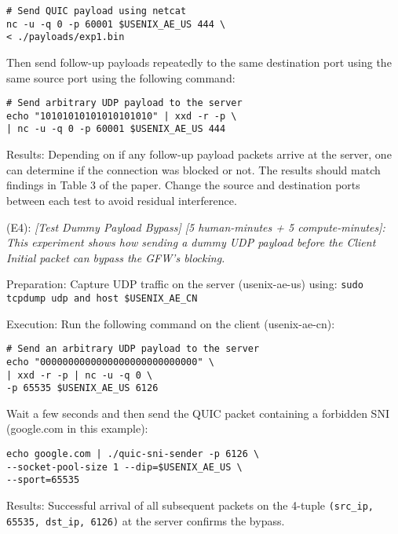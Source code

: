 \begin{compactdesc}
\begin{asparadesc}
\begin{verbatim}
# Send QUIC payload using netcat
nc -u -q 0 -p 60001 $USENIX_AE_US 444 \ 
< ./payloads/exp1.bin
\end{verbatim}
Then send follow-up payloads repeatedly to the same destination port using the same source port using the following command:
\begin{verbatim}
# Send arbitrary UDP payload to the server
echo "10101010101010101010" | xxd -r -p \
| nc -u -q 0 -p 60001 $USENIX_AE_US 444
\end{verbatim}

        \item[Results:] Depending on if any follow-up payload packets arrive at the server, one can determine if the connection was blocked or not. The results should match findings in Table 3 of the paper. Change the source and destination ports between each test to avoid residual interference.
    \end{asparadesc}





    \item[(E4):] \textit{[Test Dummy Payload Bypass] [5 human-minutes + 5 compute-minutes]: This experiment shows how sending a dummy UDP payload before the Client Initial packet can bypass the GFW's blocking.}
    \begin{asparadesc}
        \item[Preparation:] Capture UDP traffic on the server (usenix-ae-us) using: \texttt{sudo tcpdump udp and host \$USENIX\_AE\_CN }
        \item[Execution:] Run the following command on the client (usenix-ae-cn):
\begin{verbatim}
# Send an arbitrary UDP payload to the server
echo "0000000000000000000000000000" \
| xxd -r -p | nc -u -q 0 \
-p 65535 $USENIX_AE_US 6126
\end{verbatim}
Wait a few seconds and then send the QUIC packet containing a forbidden SNI (google.com in this example):
\begin{verbatim}
echo google.com | ./quic-sni-sender -p 6126 \
--socket-pool-size 1 --dip=$USENIX_AE_US \
--sport=65535
\end{verbatim}
        \item[Results:] Successful arrival of all subsequent packets on the 4-tuple \texttt{(src\_ip, 65535, dst\_ip, 6126)} at the server confirms the bypass. 
    \end{asparadesc}

\end{compactdesc}



